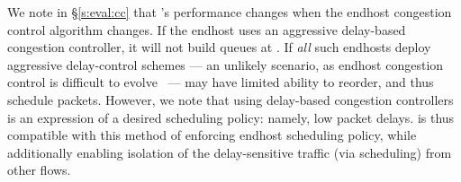 We note in \S\ref{s:eval:cc} that \name's performance changes when the endhost congestion control algorithm changes.
If the endhost uses an aggressive delay-based congestion controller, it will not build queues at \name.
If \emph{all} such endhosts deploy aggressive delay-control schemes --- an unlikely scenario, as endhost congestion control is difficult to evolve~\cite{quic} --- \name may have limited ability to reorder, and thus schedule packets.
However, we note that using delay-based congestion controllers is an expression of a desired scheduling policy: namely, low packet delays.
\name is thus compatible with this method of enforcing endhost scheduling policy, while additionally enabling isolation of the delay-sensitive traffic (via scheduling) from other flows.
%

